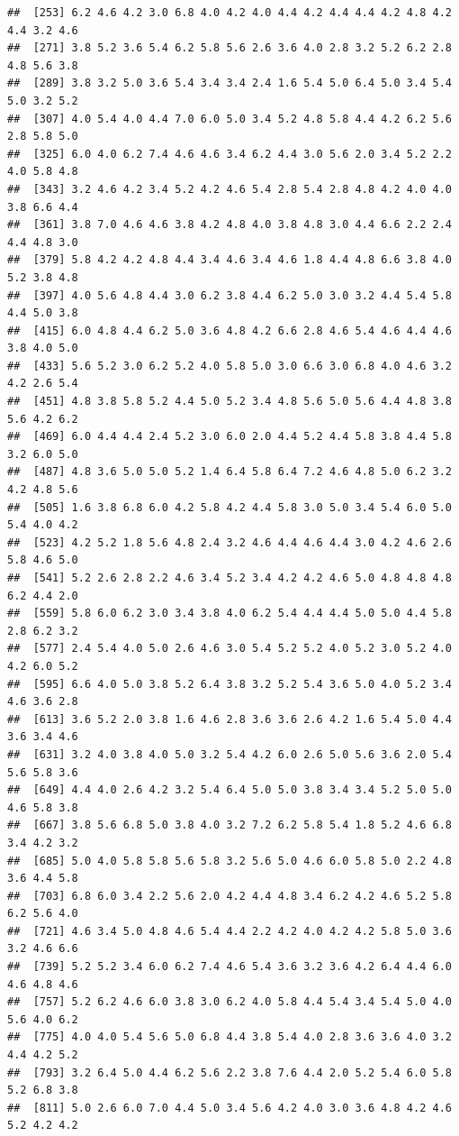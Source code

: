 \begin{ExerciseList}
\begin{knitrout}
\begin{kframe}
\begin{verbatim}
##  [253] 6.2 4.6 4.2 3.0 6.8 4.0 4.2 4.0 4.4 4.2 4.4 4.4 4.2 4.8 4.2 4.4 3.2 4.6
##  [271] 3.8 5.2 3.6 5.4 6.2 5.8 5.6 2.6 3.6 4.0 2.8 3.2 5.2 6.2 2.8 4.8 5.6 3.8
##  [289] 3.8 3.2 5.0 3.6 5.4 3.4 3.4 2.4 1.6 5.4 5.0 6.4 5.0 3.4 5.4 5.0 3.2 5.2
##  [307] 4.0 5.4 4.0 4.4 7.0 6.0 5.0 3.4 5.2 4.8 5.8 4.4 4.2 6.2 5.6 2.8 5.8 5.0
##  [325] 6.0 4.0 6.2 7.4 4.6 4.6 3.4 6.2 4.4 3.0 5.6 2.0 3.4 5.2 2.2 4.0 5.8 4.8
##  [343] 3.2 4.6 4.2 3.4 5.2 4.2 4.6 5.4 2.8 5.4 2.8 4.8 4.2 4.0 4.0 3.8 6.6 4.4
##  [361] 3.8 7.0 4.6 4.6 3.8 4.2 4.8 4.0 3.8 4.8 3.0 4.4 6.6 2.2 2.4 4.4 4.8 3.0
##  [379] 5.8 4.2 4.2 4.8 4.4 3.4 4.6 3.4 4.6 1.8 4.4 4.8 6.6 3.8 4.0 5.2 3.8 4.8
##  [397] 4.0 5.6 4.8 4.4 3.0 6.2 3.8 4.4 6.2 5.0 3.0 3.2 4.4 5.4 5.8 4.4 5.0 3.8
##  [415] 6.0 4.8 4.4 6.2 5.0 3.6 4.8 4.2 6.6 2.8 4.6 5.4 4.6 4.4 4.6 3.8 4.0 5.0
##  [433] 5.6 5.2 3.0 6.2 5.2 4.0 5.8 5.0 3.0 6.6 3.0 6.8 4.0 4.6 3.2 4.2 2.6 5.4
##  [451] 4.8 3.8 5.8 5.2 4.4 5.0 5.2 3.4 4.8 5.6 5.0 5.6 4.4 4.8 3.8 5.6 4.2 6.2
##  [469] 6.0 4.4 4.4 2.4 5.2 3.0 6.0 2.0 4.4 5.2 4.4 5.8 3.8 4.4 5.8 3.2 6.0 5.0
##  [487] 4.8 3.6 5.0 5.0 5.2 1.4 6.4 5.8 6.4 7.2 4.6 4.8 5.0 6.2 3.2 4.2 4.8 5.6
##  [505] 1.6 3.8 6.8 6.0 4.2 5.8 4.2 4.4 5.8 3.0 5.0 3.4 5.4 6.0 5.0 5.4 4.0 4.2
##  [523] 4.2 5.2 1.8 5.6 4.8 2.4 3.2 4.6 4.4 4.6 4.4 3.0 4.2 4.6 2.6 5.8 4.6 5.0
##  [541] 5.2 2.6 2.8 2.2 4.6 3.4 5.2 3.4 4.2 4.2 4.6 5.0 4.8 4.8 4.8 6.2 4.4 2.0
##  [559] 5.8 6.0 6.2 3.0 3.4 3.8 4.0 6.2 5.4 4.4 4.4 5.0 5.0 4.4 5.8 2.8 6.2 3.2
##  [577] 2.4 5.4 4.0 5.0 2.6 4.6 3.0 5.4 5.2 5.2 4.0 5.2 3.0 5.2 4.0 4.2 6.0 5.2
##  [595] 6.6 4.0 5.0 3.8 5.2 6.4 3.8 3.2 5.2 5.4 3.6 5.0 4.0 5.2 3.4 4.6 3.6 2.8
##  [613] 3.6 5.2 2.0 3.8 1.6 4.6 2.8 3.6 3.6 2.6 4.2 1.6 5.4 5.0 4.4 3.6 3.4 4.6
##  [631] 3.2 4.0 3.8 4.0 5.0 3.2 5.4 4.2 6.0 2.6 5.0 5.6 3.6 2.0 5.4 5.6 5.8 3.6
##  [649] 4.4 4.0 2.6 4.2 3.2 5.4 6.4 5.0 5.0 3.8 3.4 3.4 5.2 5.0 5.0 4.6 5.8 3.8
##  [667] 3.8 5.6 6.8 5.0 3.8 4.0 3.2 7.2 6.2 5.8 5.4 1.8 5.2 4.6 6.8 3.4 4.2 3.2
##  [685] 5.0 4.0 5.8 5.8 5.6 5.8 3.2 5.6 5.0 4.6 6.0 5.8 5.0 2.2 4.8 3.6 4.4 5.8
##  [703] 6.8 6.0 3.4 2.2 5.6 2.0 4.2 4.4 4.8 3.4 6.2 4.2 4.6 5.2 5.8 6.2 5.6 4.0
##  [721] 4.6 3.4 5.0 4.8 4.6 5.4 4.4 2.2 4.2 4.0 4.2 4.2 5.8 5.0 3.6 3.2 4.6 6.6
##  [739] 5.2 5.2 3.4 6.0 6.2 7.4 4.6 5.4 3.6 3.2 3.6 4.2 6.4 4.4 6.0 4.6 4.8 4.6
##  [757] 5.2 6.2 4.6 6.0 3.8 3.0 6.2 4.0 5.8 4.4 5.4 3.4 5.4 5.0 4.0 5.6 4.0 6.2
##  [775] 4.0 4.0 5.4 5.6 5.0 6.8 4.4 3.8 5.4 4.0 2.8 3.6 3.6 4.0 3.2 4.4 4.2 5.2
##  [793] 3.2 6.4 5.0 4.4 6.2 5.6 2.2 3.8 7.6 4.4 2.0 5.2 5.4 6.0 5.8 5.2 6.8 3.8
##  [811] 5.0 2.6 6.0 7.0 4.4 5.0 3.4 5.6 4.2 4.0 3.0 3.6 4.8 4.2 4.6 5.2 4.2 4.2

\end{verbatim}
\end{kframe}
\end{knitrout}
\end{ExerciseList}
